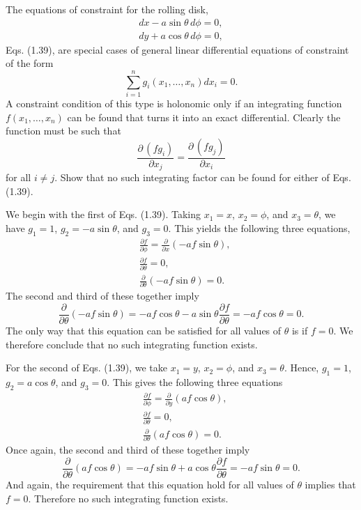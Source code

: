 \begin{questions}
\question The equations of constraint for the rolling disk, 
\begin{align*}
dx - a \sin \theta \, d \phi = 0, \\
dy + a \cos \theta \, d \phi = 0,
\end{align*}
Eqs. (1.39), are special cases of general linear differential equations of constraint of the form 
\[
\sum_{i = 1}^{n} g_i ( x_1, \ldots, x_n ) dx_i = 0.
\]
A constraint condition of this type is holonomic only if an integrating function $f ( x_1, \ldots, x_n )$ can be found that turns it into an exact differential. Clearly the function must be such that 
\[
\frac{\partial \, ( f g_i )}{\partial x_j} = \frac{\partial \, ( f g_j )}{\partial x_i}
\]
for all $i \neq j$. Show that no such integrating factor can be found for either of Eqs. (1.39).
\begin{solution}
We begin with the first of Eqs. (1.39). Taking $x_1 = x$, $x_2 = \phi$, and $x_3 = \theta$, we have $g_1 = 1$, $g_2 = -a \sin \theta$, and $g_3 = 0$. This yields the following three equations,
\begin{align*}
& \frac{\partial f}{\partial \phi} = \frac{\partial}{\partial x} ( -a f \sin \theta ), \\
& \frac{\partial f}{\partial \theta} = 0, \\
& \frac{\partial}{\partial \theta} ( -a f \sin \theta ) = 0.
\end{align*}
The second and third of these together imply
\[
\frac{\partial}{\partial \theta} ( -a f \sin \theta ) = -a f \cos \theta - a \sin \theta \frac{\partial f}{\partial \theta} = -a f \cos \theta = 0.
\]
The only way that this equation can be satisfied for all values of $\theta$ is if $f = 0$. We therefore conclude that no such integrating function exists. 

For the second of Eqs. (1.39), we take $x_1 = y$, $x_2 = \phi$, and $x_3 = \theta$. Hence, $g_1 = 1$, $g_2 = a \cos \theta$, and $g_3 = 0$. This gives the following three equations 
\begin{align*}
& \frac{\partial f}{\partial \phi} = \frac{\partial}{\partial y} ( a f \cos \theta ), \\
& \frac{\partial f}{\partial \theta} = 0, \\
& \frac{\partial}{\partial \theta} ( a f \cos \theta) = 0.
\end{align*}
Once again, the second and third of these together imply 
\[
\frac{\partial}{\partial \theta} ( a f \cos \theta) = -a f \sin \theta + a \cos \theta \frac{\partial f}{\partial \theta} = -a f \sin \theta = 0.
\]
And again, the requirement that this equation hold for all values of $\theta$ implies that $f = 0$. Therefore no such integrating function exists.
\end{solution}


\end{questions}
